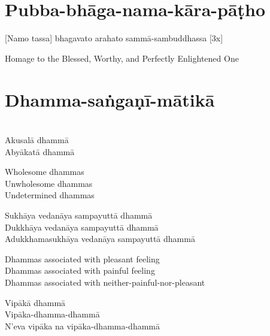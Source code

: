 \section{Pubba-bhāga-nama-kāra-pāṭho}
\label{pubba-bhaga-nama-kara-patho}

\vspace{-0.85em}

[Namo tassa] bhagavato arahato sammā-sambuddhassa \hfill{[3x]}

\begin{english}
  Homage to the Blessed, Worthy, and Perfectly Enlightened One
\end{english}

\vspace{1em}

\section{Dhamma-saṅgaṇī-mātikā}
\label{dhamma-sangani-matika}

\vspace{-0.8em}

\begin{pali-hang}
\\
Akusalā dhammā\\
Abyākatā dhammā
\end{pali-hang}

\begin{english-verses}
  Wholesome dhammas\\
  Unwholesome dhammas\\
  Undetermined dhammas
\end{english-verses}

\begin{pali-hang-continued}
Sukhāya vedanāya sampayuttā dhammā\\
Dukkhāya vedanāya sampayuttā dhammā\\
Adukkhamasukhāya vedanāya sampayuttā dhammā
\end{pali-hang-continued}

\begin{english-verses}
  Dhammas associated with pleasant feeling\\
  Dhammas associated with painful feeling\\
  Dhammas associated with neither-painful-nor-pleasant
\end{english-verses}

\begin{pali-hang-continued}
Vipākā dhammā\\
Vipāka-dhamma-dhammā\\
N'eva vipāka na vipāka-dhamma-dhammā
\end{pali-hang-continued}

